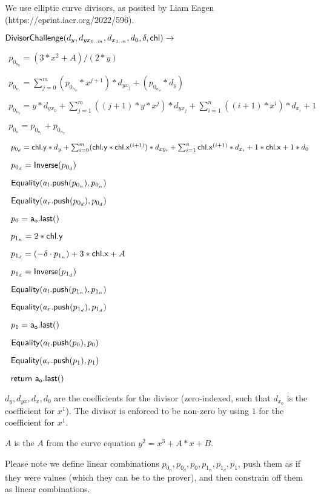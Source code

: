 \documentclass[]{article}
\begin{document}
We use elliptic curve divisors, as posited by Liam Eagen (https://eprint.iacr.org/2022/596).

\newcommand{\dloglhs}{\mathsf{DivisorChallenge}}

$\dloglhs(d_y, d_{yx_{0..m}}, d_{x_{1..n}}, d_0, \delta, \chl) \rightarrow$

$~~p_{0_{n_0}} = (3 * x^2 + A) / (2 * y)$

$~~p_{0_{n_1}} = \sum^m_{j=0} (p_{0_{n_w}} * x^{j+1}) * d_{yx_j} + (p_{0_{n_w}} * d_y)$

$~~p_{0_{n_2}} = y * d_{yx_0} + \sum^m_{j=1} ((j+1) * y * x^j) * d_{yx_j} + \sum^n_{i=1} ((i+1) * x^i) * d_{x_i} + 1$

$~~p_{0_n} = p_{0_{n_1}} + p_{0_{n_2}}$

$~~p_{0_d} = \mathsf{chl}\mathsf{.y} * d_y + \sum^m_{i=0} (\mathsf{chl}\mathsf{.y} * \mathsf{chl}\mathsf{.x}^{(i+1)}) * d_{xy_{i}} + \sum^n_{i=1} \mathsf{chl}\mathsf{.x}^{(i+1)} * d_{x_{i}} + 1 * \mathsf{chl}\mathsf{.x} + 1 * d_0$

$~~p_{0_d} = \mathsf{Inverse}(p_{0_d})$

$~~\mathsf{Equality}(a_l\mathsf{.push}(p_{0_n}), p_{0_n})$

$~~\mathsf{Equality}(a_r\mathsf{.push}(p_{0_d}), p_{0_d})$

$~~p_0 = \mathsf{a_o.last()}$

$~~p_{1_n} = 2 * \mathsf{chl}\mathsf{.y}$

$~~p_{1_d} = (-\delta \cdot p_{1_n}) + 3 * \mathsf{chl}\mathsf{.x} + A$

$~~p_{1_d} = \mathsf{Inverse}(p_{1_d})$

$~~\mathsf{Equality}(a_l\mathsf{.push}(p_{1_n}), p_{1_n})$

$~~\mathsf{Equality}(a_r\mathsf{.push}(p_{1_d}), p_{1_d})$

$~~p_1 = \mathsf{a_o.last()}$

$~~\mathsf{Equality}(a_l\mathsf{.push}(p_0), p_0)$

$~~\mathsf{Equality}(a_r\mathsf{.push}(p_1), p_1)$

$~~\mathsf{return} ~\mathsf{a_o.last()}$

$d_y, d_{yx}, d_x, d_0$ are the coefficients for the divisor (zero-indexed, such that $d_{x_0}$ is the coefficient for $x^1$). The divisor is enforced to be non-zero by using $1$ for the coefficient for $x^1$.

$A$ is the $A$ from the curve equation $y^2 = x^3 + A * x + B$.

Please note we define linear combinations $p_{0_n}, p_{0_d}, p_0, p_{1_n}, p_{1_d}, p_1$, push them as if they were values (which they can be to the prover), and then constrain off them as linear combinations.

\newcommand{\dlog}{\mathsf{DiscreteLog_{G}}}
\end{document}
